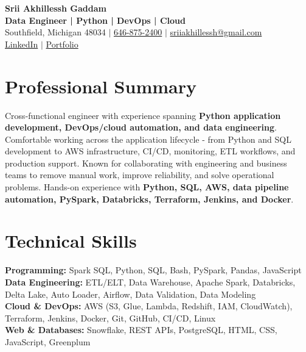 \documentclass[letterpaper,10pt]{article}
\begin{document}
\fontsize{9.35pt}{10.45pt}\selectfont

\begin{center}
    {\LARGE \textbf{Srii Akhillessh Gaddam}} \\[-1pt]
    \textbf{Data Engineer | Python | DevOps | Cloud} \\[2pt]
    Southfield, Michigan 48034 $|$
    \href{tel:6468752400}{646-875-2400} $|$
    \href{mailto:sriiakhillessh@gmail.com}{sriiakhillessh@gmail.com} \\[1pt]
    \href{https://www.linkedin.com/in/srii-akhiilessh-gaddam-b48668191/}{LinkedIn} $|$
    \href{https://sriiakhillesshg.github.io/portfolio/}{Portfolio}
\end{center}
\vspace{-8pt}

\section{Professional Summary}
\small{Cross-functional engineer with experience spanning \textbf{Python application development, DevOps/cloud automation, and data engineering}. Comfortable working across the application lifecycle - from Python and SQL development to AWS infrastructure, CI/CD, monitoring, ETL workflows, and production support. Known for collaborating with engineering and business teams to remove manual work, improve reliability, and solve operational problems. Hands-on experience with \textbf{Python, SQL, AWS, data pipeline automation, PySpark, Databricks, Terraform, Jenkins, and Docker}.}

\section{Technical Skills}
\small{
\textbf{Programming:} Spark SQL, Python, SQL, Bash, PySpark, Pandas, JavaScript \\
\textbf{Data Engineering:} ETL/ELT, Data Warehouse, Apache Spark, Databricks, Delta Lake, Auto Loader, Airflow, Data Validation, Data Modeling \\
\textbf{Cloud \& DevOps:} AWS (S3, Glue, Lambda, Redshift, IAM, CloudWatch), Terraform, Jenkins, Docker, Git, GitHub, CI/CD, Linux \\
\textbf{Web \& Databases:} Snowflake, REST APIs, PostgreSQL, HTML, CSS, JavaScript, Greenplum
}
\end{document}
